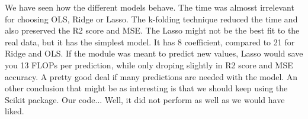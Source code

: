 We have seen how the different models behave. The time was almosst irrelevant for choosing
OLS, Ridge or Lasso. The k-folding technique reduced the time and also preserved the R2 score and MSE.
The Lasso might not be the best fit to the real data, but it has the simplest model.
It has 8 coefficient, compared to 21 for Ridge and OLS. If the module was meant to predict
new values, Lasso would save you 13 FLOPs per prediction, while only droping slightly in R2
score and MSE accuracy. A pretty good deal if many predictions are needed with the model. An other conclusion
that might be as interesting is that we should keep using the Scikit package. Our code...
Well, it did not perform as well as we would have liked.
\\
\\
\\
\\
\\
\\
\\
\\
\\
\\
\\
\\
\\
\\
\\
\\
\\
\\
